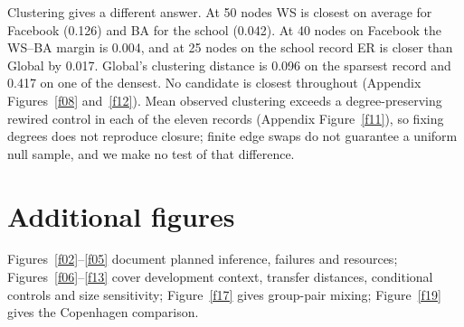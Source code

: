 \documentclass{article}
\begin{document}
Clustering gives a different answer. At 50 nodes WS is closest on average for Facebook (0.126) and BA for the school (0.042). At 40 nodes on Facebook the WS--BA margin is 0.004, and at 25 nodes on the school record ER is closer than Global by 0.017. Global's clustering distance is 0.096 on the sparsest record and 0.417 on one of the densest. No candidate is closest throughout (Appendix Figures~\ref{f08} and~\ref{f12}). Mean observed clustering exceeds a degree-preserving rewired control in each of the eleven records (Appendix Figure~\ref{f11}), so fixing degrees does not reproduce closure; finite edge swaps do not guarantee a uniform null sample, and we make no test of that difference.

\section{Additional figures}
Figures~\ref{f02}--\ref{f05} document planned inference, failures and resources; Figures~\ref{f06}--\ref{f13} cover development context, transfer distances, conditional controls and size sensitivity; Figure~\ref{f17} gives group-pair mixing; Figure~\ref{f19} gives the Copenhagen comparison.
\end{document}
